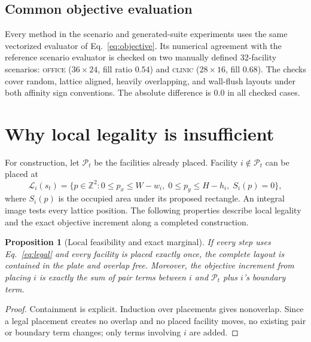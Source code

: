 \documentclass[preprint,12pt,authoryear,nonatbib]{elsarticle}
\newtheorem{prop}{Proposition}
\newcommand{\Z}{\mathbb{Z}}
\newcommand{\cL}{\mathcal{L}}
\newcommand{\cP}{\mathcal{P}}
\begin{document}
\subsection{Common objective evaluation}
Every method in the scenario and generated-suite experiments uses the same
vectorized evaluator of Eq.~\eqref{eq:objective}. Its numerical agreement with
the reference scenario evaluator is checked on two manually defined
$32$-facility scenarios: \textsc{office} ($36\times24$, fill ratio $0.54$) and
\textsc{clinic} ($28\times16$, fill $0.68$). The checks cover random, lattice
aligned, heavily overlapping, and wall-flush layouts under both affinity sign
conventions. The absolute difference is $0.0$ in all checked cases.


\section{Why local legality is insufficient}
\label{sec:improve}
\label{sec:improve_empirical}
\label{sec:construct}

For construction, let $\cP_t$ be the facilities already placed. Facility
$i\notin\cP_t$ can be placed at
\begin{equation}
\cL_i(s_t)=\{p\in\Z^2:0\le p_x\le W-w_i,\;0\le p_y\le H-h_i,\;S_i(p)=0\},
\label{eq:legal}
\end{equation}
where $S_i(p)$ is the occupied area under its proposed rectangle. An integral
image tests every lattice position. The following properties describe local
legality and the exact objective increment along a completed construction.

\begin{prop}[Local feasibility and exact marginal]
\label{prop:invariant}
\label{prop:marginal}
If every step uses Eq.~\eqref{eq:legal} and every facility is placed exactly
once, the complete layout is contained in the plate and overlap free. Moreover,
the objective increment from placing $i$ is exactly the sum of pair terms
between $i$ and $\cP_t$ plus $i$'s boundary term.
\end{prop}
\begin{proof}
Containment is explicit. Induction over placements gives nonoverlap. Since a
legal placement creates no overlap and no placed facility moves, no existing pair
or boundary term changes; only terms involving $i$ are added.
\end{proof}
\end{document}
